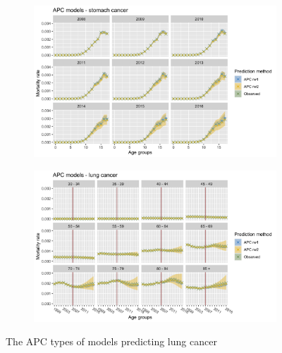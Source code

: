 \begin{figure}[h!]
    \centering
    \begin{subfigure}[b]{.45\linewidth}
        \includegraphics[width=\linewidth]{real-data/real-data-univariate/Figures/univariate-APC-by-age-lung.png}
    \end{subfigure}
    \begin{subfigure}[b]{.45\linewidth}
        \includegraphics[width=\linewidth]{real-data/real-data-univariate/Figures/univariate-APC-by-period-lung.png}
    \end{subfigure}
    \caption{The APC types of models predicting lung cancer}
    \label{fig:uv-APC-lung}
\end{figure}

